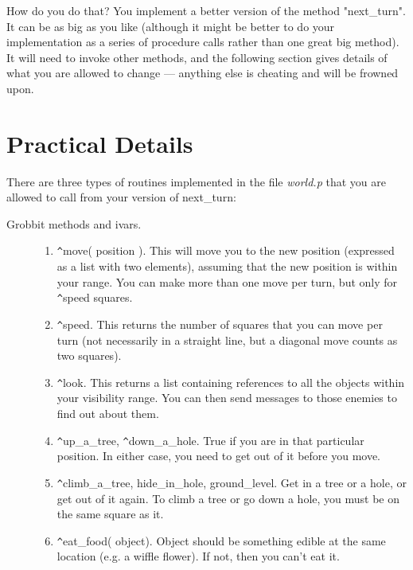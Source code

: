How do you do that? You implement a better version of the method
"next\_turn". It can be as big as you like (although it might be
better to do your implementation as a series of procedure calls rather
than one great big method). It will need to invoke other methods, and the
following section gives details of what you are allowed to change ---
anything else is cheating and will be frowned upon.

\section{Practical Details}

There are three types of routines implemented in the file {\em world.p} that
you are allowed to call from your version of next\_turn:

\begin{description}

\item [Grobbit methods and ivars.]

\begin{enumerate}

\item  \verb+^+move( position ). This will move you to the new position
(expressed as a list with two elements), assuming that the new position is
within your range. You can make more than one move per turn, but only for
\verb+^+speed squares.

\item \verb+^+speed. This returns the number of squares that you can move per
turn (not necessarily in a straight line, but a diagonal move counts as two
squares).

\item \verb+^+look. This returns a list containing references to all the
objects within your visibility range. You can then send messages to those
enemies to find out about them.

\item \verb+^+up\_a\_tree, \verb+^+down\_a\_hole. True if you are in that
particular position. In either case, you need to get out of it before you
move.

\item \verb+^+climb\_a\_tree, hide\_in\_hole, ground\_level. Get in a tree or a
hole, or get out of it again. To climb a tree or go down a hole, you must be
on the same square as it.

\item \verb+^+eat\_food( object). Object should be something edible at the
same location (e.g. a wiffle flower). If not, then you can't eat it. 


\end{enumerate}
\end{description}
